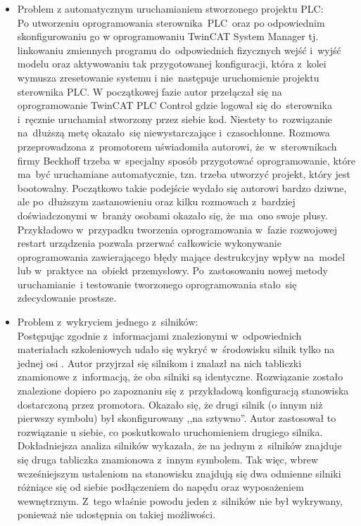 \begin{itemize}
\item Problem z automatycznym uruchamianiem stworzonego projektu PLC:\\[1mm]
Po utworzeniu oprogramowania sterownika~PLC~oraz po odpowiednim skonfigurowaniu go w oprogramowaniu TwinCAT System Manager tj. linkowaniu zmiennych programu do~odpowiednich fizycznych wejść i~wyjść modelu oraz aktywowaniu tak przygotowanej konfiguracji, która z~kolei wymusza zresetowanie systemu i nie~następuje uruchomienie projektu sterownika PLC. W początkowej fazie autor przełączał się na oprogramowanie TwinCAT PLC Control gdzie logował się do~sterownika i~ręcznie uruchamiał stworzony przez siebie kod. Niestety to~rozwiązanie na~dłuższą metę okazało~się niewystarczające i~czasochłonne. Rozmowa przeprowadzona z~promotorem uświadomiła autorowi, że~w~sterownikach firmy Beckhoff trzeba w~specjalny sposób przygotować oprogramowanie, które ma~być uruchamiane automatycznie, tzn. trzeba utworzyć projekt, który jest bootowalny. Początkowo takie podejście wydało się autorowi bardzo dziwne, ale po~dłuższym zastanowieniu oraz kilku rozmowach z~bardziej doświadczonymi w~branży osobami okazało się, że~ma~ono swoje plusy. Przykładowo w~przypadku tworzenia oprogramowania w~fazie rozwojowej restart urządzenia pozwala przerwać całkowicie wykonywanie oprogramowania zawierającego błędy mające destrukcyjny wpływ na~model lub w~praktyce na~obiekt przemysłowy. Po~zastosowaniu nowej metody uruchamianie~i testowanie tworzonego oprogramowania stało~się zdecydowanie prostsze.

\item Problem z~wykryciem jednego z~silników:\\[1mm]
Postępując zgodnie z~informacjami znalezionymi w~odpowiednich materiałach szkoleniowych udało się wykryć w~środowisku silnik tylko na jednej osi \cite{silniki}. Autor przyjrzał się silnikom i znalazł na nich tabliczki znamionowe z~informacją, że oba silniki są identyczne. Rozwiązanie zostało znalezione dopiero po zapoznaniu się z~przykładową konfiguracją stanowiska dostarczoną przez promotora. Okazało się, że drugi silnik (o innym niż pierwszy symbolu) był skonfigurowany ,,na sztywno''. Autor zastosował to rozwiązanie u siebie, co poskutkowało uruchomieniem drugiego silnika. Dokładniejsza analiza silników wykazała, że na jednym z~silników znajduje się druga tabliczka znamionowa z~innym symbolem. Tak więc, wbrew wcześniejszym ustaleniom na stanowisku znajdują się dwa odmienne silniki różniące się od siebie podłączeniem do napędu oraz wyposażeniem wewnętrznym. Z~tego właśnie powodu jeden z~silników nie był wykrywany, ponieważ nie udostępnia on takiej możliwości.


\end{itemize}
